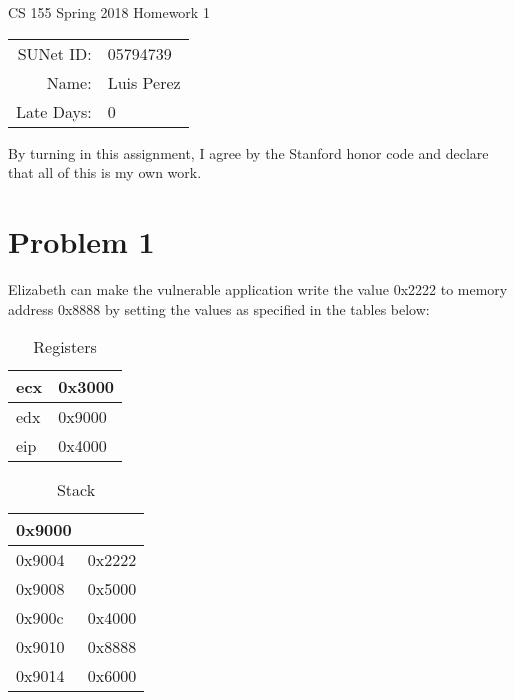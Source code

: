 \documentclass[12pt]{article}
\begin{document}
\begin{center}
{\Large CS 155 Spring 2018 Homework 1}

\begin{tabular}{rl}
SUNet ID: & 05794739 \\
Name: & Luis Perez \\
Late Days: & 0
\end{tabular}
\end{center}

By turning in this assignment, I agree by the Stanford honor code and declare
that all of this is my own work.

\section*{Problem 1}
Elizabeth can make the vulnerable application write the value 0x2222 to memory address 0x8888 by setting the values as specified in the tables below:

\begin{table}[!h]
\centering
\caption{Registers}
\label{table:registers}
\begin{tabular}{|l|l|}
\hline
ecx & 0x3000 \\ \hline
edx & 0x9000 \\ \hline
eip & 0x4000 \\ \hline
\end{tabular}
\end{table}

\begin{table}[!h]
\centering
\caption{Stack}
\label{table:stack}
\begin{tabular}{|l|l|}
\hline
0x9000 &        \\ \hline
0x9004 & 0x2222 \\ \hline
0x9008 & 0x5000 \\ \hline
0x900c & 0x4000 \\ \hline
0x9010 & 0x8888 \\ \hline
0x9014 & 0x6000 \\ \hline
\end{tabular}
\end{table}

\pagebreak
\end{document}
